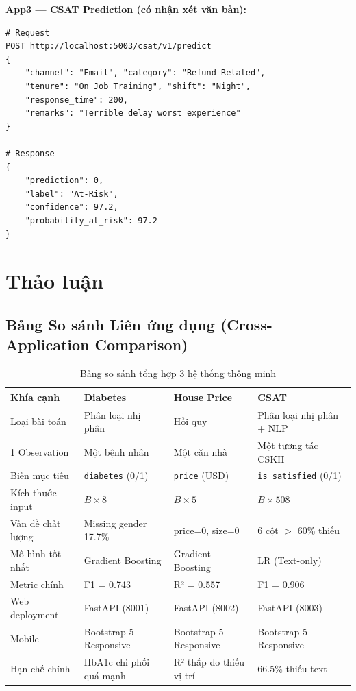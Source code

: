 \documentclass[12pt, a4paper]{article}
\begin{document}
\textbf{App3 — CSAT Prediction (có nhận xét văn bản):}
\begin{lstlisting}
# Request
POST http://localhost:5003/csat/v1/predict
{
    "channel": "Email", "category": "Refund Related",
    "tenure": "On Job Training", "shift": "Night",
    "response_time": 200,
    "remarks": "Terrible delay worst experience"
}

# Response
{
    "prediction": 0,
    "label": "At-Risk",
    "confidence": 97.2,
    "probability_at_risk": 97.2
}
\end{lstlisting}

\section{Thảo luận}

\subsection{Bảng So sánh Liên ứng dụng (Cross-Application Comparison)}

\begin{table}[H]
\centering
\caption{Bảng so sánh tổng hợp 3 hệ thống thông minh}
\label{tab:cross_comparison}
\small
\begin{tabularx}{\textwidth}{|l|X|X|X|}
\hline
\textbf{Khía cạnh} & \textbf{Diabetes} & \textbf{House Price} & \textbf{CSAT} \\
\hline
Loại bài toán & Phân loại nhị phân & Hồi quy & Phân loại nhị phân + NLP \\
\hline
1 Observation & Một bệnh nhân & Một căn nhà & Một tương tác CSKH \\
\hline
Biến mục tiêu & \texttt{diabetes} (0/1) & \texttt{price} (USD) & \texttt{is\_satisfied} (0/1) \\
\hline
Kích thước input & $B \times 8$ & $B \times 5$ & $B \times 508$ \\
\hline
Vấn đề chất lượng & Missing gender 17.7\% & price=0, size=0 & 6 cột $>$ 60\% thiếu \\
\hline
Mô hình tốt nhất & Gradient Boosting & Gradient Boosting & LR (Text-only) \\
\hline
Metric chính & F1 = 0.743 & R² = 0.557 & F1 = 0.906 \\
\hline
Web deployment & FastAPI (8001) & FastAPI (8002) & FastAPI (8003) \\
\hline
Mobile & Bootstrap 5 Responsive & Bootstrap 5 Responsive & Bootstrap 5 Responsive \\
\hline
Hạn chế chính & HbA1c chi phối quá mạnh & R² thấp do thiếu vị trí & 66.5\% thiếu text \\
\hline
\end{tabularx}
\end{table}
\end{document}
